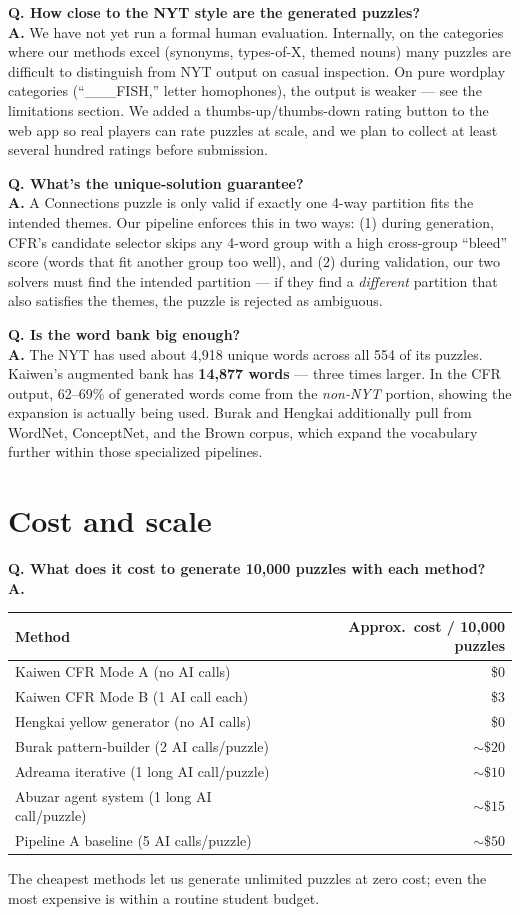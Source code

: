 \documentclass[11pt, letterpaper]{article}
\newcommand{\qitem}[1]{\vspace{0.6em}\noindent\textbf{\color{accent}Q. #1}\\[0.2em]}
\newcommand{\aitem}{\noindent\textbf{A.} }
\begin{document}
\qitem{How close to the NYT style are the generated puzzles?}
\aitem
We have not yet run a formal human evaluation. Internally, on the categories
where our methods excel (synonyms, types-of-X, themed nouns) many puzzles
are difficult to distinguish from NYT output on casual inspection. On pure
wordplay categories (``\_\_\_FISH,'' letter homophones), the output is
weaker --- see the limitations section. We added a thumbs-up/thumbs-down
rating button to the web app so real players can rate puzzles at scale, and
we plan to collect at least several hundred ratings before submission.

\qitem{What's the unique-solution guarantee?}
\aitem
A Connections puzzle is only valid if exactly one 4-way partition fits the
intended themes. Our pipeline enforces this in two ways: (1) during
generation, CFR's candidate selector skips any 4-word group with a high
cross-group ``bleed'' score (words that fit another group too well), and (2)
during validation, our two solvers must find the intended partition --- if
they find a \emph{different} partition that also satisfies the themes, the
puzzle is rejected as ambiguous.

\qitem{Is the word bank big enough?}
\aitem
The NYT has used about 4{,}918 unique words across all 554 of its puzzles.
Kaiwen's augmented bank has \textbf{14{,}877 words} --- three times larger.
In the CFR output, 62--69\% of generated words come from the \emph{non-NYT}
portion, showing the expansion is actually being used. Burak and Hengkai
additionally pull from WordNet, ConceptNet, and the Brown corpus, which
expand the vocabulary further within those specialized pipelines.

\section*{Cost and scale}

\qitem{What does it cost to generate 10{,}000 puzzles with each method?}
\aitem
\begin{center}
\begin{tabular}{lr}
\toprule
\textbf{Method} & \textbf{Approx.~cost / 10{,}000 puzzles} \\
\midrule
Kaiwen CFR Mode A (no AI calls)        & \$0      \\
Kaiwen CFR Mode B (1 AI call each)     & \$3      \\
Hengkai yellow generator (no AI calls) & \$0      \\
Burak pattern-builder (2 AI calls/puzzle) & ${\sim}\$20$  \\
Adreama iterative (1 long AI call/puzzle) & ${\sim}\$10$  \\
Abuzar agent system (1 long AI call/puzzle) & ${\sim}\$15$ \\
Pipeline A baseline (5 AI calls/puzzle)  & ${\sim}\$50$ \\
\bottomrule
\end{tabular}
\end{center}
The cheapest methods let us generate unlimited puzzles at zero cost; even
the most expensive is within a routine student budget.
\end{document}
